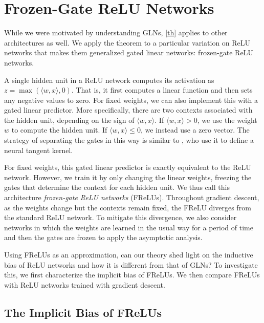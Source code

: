 \documentclass{article}
\theoremstyle{plain}
\theoremstyle{definition}
\theoremstyle{remark}
\begin{document}
\section{Frozen-Gate ReLU Networks}

While we were motivated by understanding GLNs, \cref{th} applies to other architectures as well.
We apply the theorem to a particular variation on ReLU networks that makes them generalized gated linear networks: frozen-gate ReLU networks.

A single hidden unit in a ReLU network computes its activation as $z=\max(\langle w,x\rangle,0)$.
That is, it first computes a linear function and then sets any negative values to zero.
For fixed weights, we can also implement this with a gated linear predictor.
More specifically, there are two contexts associated with the hidden unit, depending on the sign of $\langle w,x\rangle$.
If $\langle w,x\rangle >0$, we use the weight $w$ to compute the hidden unit.
If $\langle w,x\rangle\leq 0$, we instead use a zero vector.
The strategy of separating the gates in this way is similar to \citet{lakshminarayanan_neural_2020}, who use it to define a neural tangent kernel.

For fixed weights, this gated linear predictor is exactly equivalent to the ReLU network.
However, we train it by only changing the linear weights, freezing the gates that determine the context for each hidden unit.
We thus call this architecture \emph{frozen-gate ReLU networks} (FReLUs).
Throughout gradient descent, as the weights change but the contexts remain fixed, the FReLU diverges from the standard ReLU network.  To mitigate this divergence, we also consider networks in which the weights are learned in the usual way for a period of time and then the gates are frozen to apply the asymptotic analysis.

Using FReLUs as an approximation, can our theory shed light on the inductive bias of ReLU networks and how it is different from that of GLNs?
To investigate this, we first characterize the implicit bias of FReLUs.
We then compare FReLUs with ReLU networks trained with gradient descent.

\subsection{The Implicit Bias of FReLUs}
\end{document}
